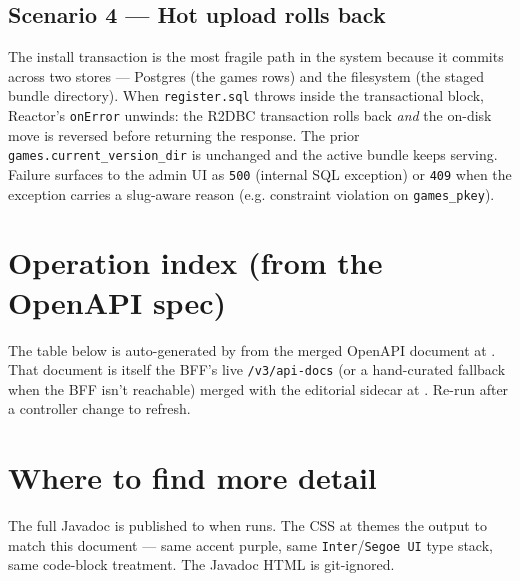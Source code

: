 \subsection*{Scenario 4 --- Hot upload rolls back}


The install transaction is the most fragile path in the system because
it commits across two stores --- Postgres (the games rows) and the
filesystem (the staged bundle directory). When \texttt{register.sql}
throws inside the transactional block, Reactor's \texttt{onError}
unwinds: the R2DBC transaction rolls back \emph{and} the on-disk
move is reversed before returning the response. The prior
\texttt{games.current\_version\_dir} is unchanged and the active
bundle keeps serving. Failure surfaces to the admin UI as
\texttt{500} (internal SQL exception) or \texttt{409} when the
exception carries a slug-aware reason (e.g. constraint violation on
\texttt{games\_pkey}).

\section{Operation index (from the OpenAPI spec)}

The table below is auto-generated by
 from the merged
OpenAPI document at
. That document is
itself the BFF's live \texttt{/v3/api-docs} (or a hand-curated fallback
when the BFF isn't reachable) merged with the editorial sidecar at
. Re-run
 after a controller change to refresh.


\section{Where to find more detail}

The full Javadoc is published to
 when 
runs. The CSS at 
themes the output to match this document — same accent purple, same
\texttt{Inter}/\texttt{Segoe UI} type stack, same code-block treatment.
The Javadoc HTML is git-ignored.

